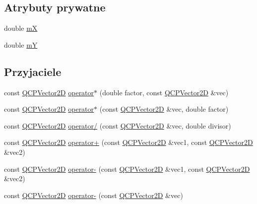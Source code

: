 \subsection*{Atrybuty prywatne}
\begin{DoxyCompactItemize}
\item 
double \hyperlink{class_q_c_p_vector2_d_ab6f67c521be2e7eea7d31175d086ac2c}{mX}
\item 
double \hyperlink{class_q_c_p_vector2_d_a1b6dbdfb973c4cb478116cd610265e13}{mY}
\end{DoxyCompactItemize}
\subsection*{Przyjaciele}
\begin{DoxyCompactItemize}
\item 
const \hyperlink{class_q_c_p_vector2_d}{Q\+C\+P\+Vector2D} \hyperlink{class_q_c_p_vector2_d_aa75268fb64b9eaee5448fb815007bee9}{operator$\ast$} (double factor, const \hyperlink{class_q_c_p_vector2_d}{Q\+C\+P\+Vector2D} \&vec)
\item 
const \hyperlink{class_q_c_p_vector2_d}{Q\+C\+P\+Vector2D} \hyperlink{class_q_c_p_vector2_d_aace10d28a76e84e7380ede1a9cb58274}{operator$\ast$} (const \hyperlink{class_q_c_p_vector2_d}{Q\+C\+P\+Vector2D} \&vec, double factor)
\item 
const \hyperlink{class_q_c_p_vector2_d}{Q\+C\+P\+Vector2D} \hyperlink{class_q_c_p_vector2_d_aa69909afc8c656999a2ea292ea01244b}{operator/} (const \hyperlink{class_q_c_p_vector2_d}{Q\+C\+P\+Vector2D} \&vec, double divisor)
\item 
const \hyperlink{class_q_c_p_vector2_d}{Q\+C\+P\+Vector2D} \hyperlink{class_q_c_p_vector2_d_a24cc5985429b12dbed4d0d3c5a917d20}{operator+} (const \hyperlink{class_q_c_p_vector2_d}{Q\+C\+P\+Vector2D} \&vec1, const \hyperlink{class_q_c_p_vector2_d}{Q\+C\+P\+Vector2D} \&vec2)
\item 
const \hyperlink{class_q_c_p_vector2_d}{Q\+C\+P\+Vector2D} \hyperlink{class_q_c_p_vector2_d_a9e01331d8debf0877ee4cba9abd83605}{operator-\/} (const \hyperlink{class_q_c_p_vector2_d}{Q\+C\+P\+Vector2D} \&vec1, const \hyperlink{class_q_c_p_vector2_d}{Q\+C\+P\+Vector2D} \&vec2)
\item 
const \hyperlink{class_q_c_p_vector2_d}{Q\+C\+P\+Vector2D} \hyperlink{class_q_c_p_vector2_d_a14c807d345ee3f22d6809bb5a4137b52}{operator-\/} (const \hyperlink{class_q_c_p_vector2_d}{Q\+C\+P\+Vector2D} \&vec)
\end{DoxyCompactItemize}
